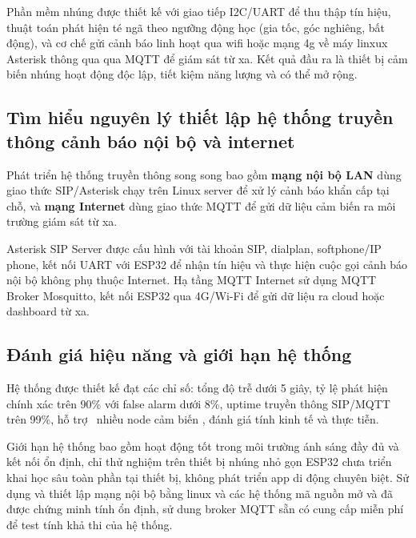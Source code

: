 Phần mềm nhúng được thiết kế với giao tiếp I2C/UART để thu thập tín hiệu, thuật toán phát hiện té ngã theo ngưỡng động học (gia tốc, góc nghiêng, bất động), và cơ chế gửi cảnh báo linh hoạt qua wifi hoặc mạng 4g về máy linxux Asterisk thông qua qua MQTT để giám sát từ xa. Kết quả đầu ra là thiết bị cảm biến nhúng hoạt động độc lập, tiết kiệm năng lượng và có thể mở rộng.

\subsection{Tìm hiểu nguyên lý thiết lập hệ thống truyền thông cảnh báo nội bộ và internet}

Phát triển hệ thống truyền thông song song bao gồm \textbf{mạng nội bộ LAN} dùng giao thức SIP/Asterisk chạy trên Linux server để xử lý cảnh báo khẩn cấp tại chỗ, và \textbf{mạng Internet} dùng giao thức MQTT để gửi dữ liệu cảm biến ra môi trường giám sát từ xa.

Asterisk SIP Server được cấu hình với tài khoản SIP, dialplan, softphone/IP phone, kết nối UART với ESP32 để nhận tín hiệu và thực hiện cuộc gọi cảnh báo nội bộ không phụ thuộc Internet. Hạ tầng MQTT Internet sử dụng MQTT Broker Mosquitto, kết nối ESP32 qua 4G/Wi-Fi để gửi dữ liệu ra cloud hoặc dashboard từ xa.


\subsection{Đánh giá hiệu năng và giới hạn hệ thống}

Hệ thống được thiết kế đạt các chỉ số: tổng độ trễ dưới 5 giây, tỷ lệ phát hiện chính xác trên 90\% với false alarm dưới 8\%, uptime truyền thông SIP/MQTT trên 99\%, hỗ trợ  nhiều node cảm biến , đánh giá tính kinh tế và thực tiễn.

Giới hạn hệ thống bao gồm hoạt động tốt trong môi trường ánh sáng đầy đủ và kết nối ổn định, chỉ thử nghiệm trên thiết bị nhúng nhỏ gọn ESP32 chưa triển khai học sâu toàn phần tại thiết bị, không phát triển app di động chuyên biệt. Sử dụng và thiết lập mạng nội bộ bằng linux và các hệ thống mã nguồn mở và đã được chứng minh tính ổn định, sử dung broker MQTT sẵn có cung cấp miễn phí để test tính khả thi của hệ thống.
